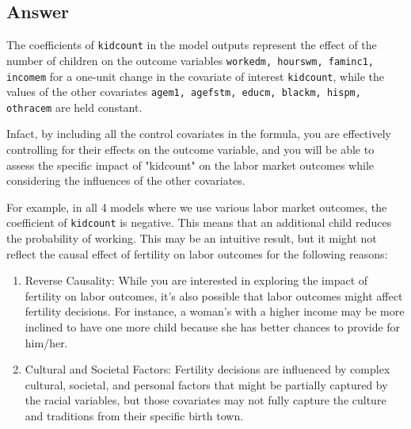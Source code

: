 \documentclass{article}
\begin{document}
	\subsection{Answer}
	The coefficients of \verb|kidcount| in the model outputs represent the effect of the number of children on the outcome variables \verb|workedm, hourswm, faminc1, incomem| for a one-unit change in the covariate of interest \verb|kidcount|, while the values of the other covariates \verb|agem1, agefstm, educm, blackm, hispm, othracem| are held constant.
	
	Infact, by including all the control covariates in the formula, you are effectively controlling for their effects on the outcome variable, and you will be able to assess the specific impact of "kidcount" on the labor market outcomes while considering the influences of the other covariates.
	
	For example, in all 4 models where we use various labor market outcomes, the coefficient of \verb*|kidcount| is negative. This means that an additional child reduces the probability of working. This may be an intuitive result, but it might not reflect the causal effect of fertility on labor outcomes for the following reasons:
	\begin{enumerate}
		\item Reverse Causality: While you are interested in exploring the impact of fertility on labor outcomes, it's also possible that labor outcomes might affect fertility decisions. For instance, a woman's with a higher income may be more inclined to have one more child because she has better chances to provide for him/her.
		\item Cultural and Societal Factors: Fertility decisions are influenced by complex cultural, societal, and personal factors that might be partially captured by the racial variables, but those covariates may not fully capture the culture and traditions from their specific birth town.
	\end{enumerate}
	
\end{document}
